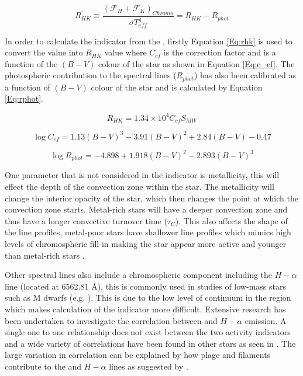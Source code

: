 \begin{equation}
    R^{'}_{HK} \equiv \frac{(\mathcal{F}_{H} + \mathcal{F}_{K})_{Chromo}}{\sigma T_{eff}^{4}} = R_{HK} - R_{phot}
    \label{Eq:Rprime}
\end{equation}

In order to calculate the \Rprime indicator from the \Smw, firstly Equation \ref{Eq:rhk} is used to convert the \Smw value into $R_{HK}$ value where $C_{cf}$ is the correction factor and is a function of the $(B-V)$ colour of the star as shown in Equation \ref{Eq:c_cf}. The photospheric contribution to the \caII spectral lines ($R_{phot}$) has also been calibrated as a function of $(B-V)$ colour of the star and is calculated by Equation \ref{Eq:rphot}.

\begin{equation}
    R_{HK} = 1.34{\times}10^{4}C_{cf}S_{MW}
    \label{Eq:rhk}
\end{equation}

\begin{equation}
    \log C_{cf} = 1.13(B - V)^{3} - 3.91(B-V)^{2} + 2.84(B-V) - 0.47
    \label{Eq:c_cf}
\end{equation}

\begin{equation}
    \log R_{phot} = -4.898 + 1.918(B-V)^{2} - 2.893(B-V)^{3}
    \label{Eq:rphot}
\end{equation}

One parameter that is not considered in the \Rprime indicator is metallicity, this will effect the depth of the convection zone within the star. The metallicity will change the interior opacity of the star, which then changes the point at which the convection zone starts. Metal-rich stars will have a deeper convection zone and thus have a longer convective turnover time ($\tau_{C}$). This also affects the shape of the \caII line profiles, metal-poor stars have shallower line profiles which mimics high levels of chromospheric fill-in making the star appear more active and younger than metal-rich stars \citep{Rocha-Pinto_Maciel_1998}.

Other spectral lines also include a chromospheric component including the $H-\alpha$ line (located at 6562.81 \AA), this is commonly used in studies of low-mass stars such as M dwarfs (e.g. \citealt{Newton_etal_2017}). This is due to the low level of continuum in the \caII region which makes calculation of the \Rprime indicator more difficult. Extensive research has been undertaken to investigate the correlation between \caII and $H-\alpha$ emission. A single one to one relationship does not exist between the two activity indicators and a wide variety of correlations have been found in other stars as seen in \citet{Cincunegui_etal_2007}. The large variation in correlation can be explained by how plage and filaments contribute to the \caII and $H-\alpha$ lines as suggested by \citet{Meunier_Delfosse_2009}.

